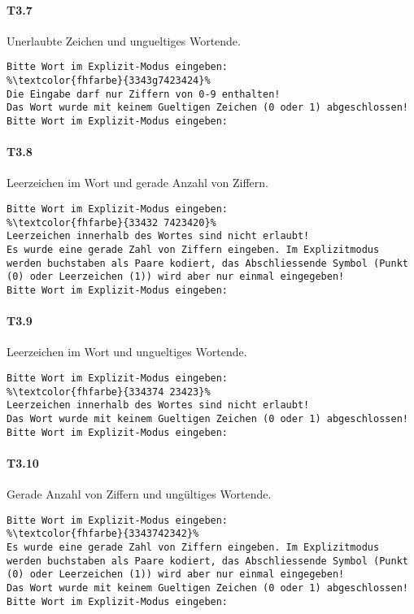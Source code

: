 \paragraph*{T3.7} Unerlaubte Zeichen und ungueltiges Wortende.
\begin{lstlisting}[escapechar=\%]
Bitte Wort im Explizit-Modus eingeben:
%\textcolor{fhfarbe}{3343g7423424}%
Die Eingabe darf nur Ziffern von 0-9 enthalten!
Das Wort wurde mit keinem Gueltigen Zeichen (0 oder 1) abgeschlossen!
Bitte Wort im Explizit-Modus eingeben:
\end{lstlisting}

\paragraph*{T3.8} Leerzeichen im Wort und gerade Anzahl von Ziffern.
\begin{lstlisting}[escapechar=\%]
Bitte Wort im Explizit-Modus eingeben:
%\textcolor{fhfarbe}{33432 7423420}%
Leerzeichen innerhalb des Wortes sind nicht erlaubt!
Es wurde eine gerade Zahl von Ziffern eingeben. Im Explizitmodus werden buchstaben als Paare kodiert, das Abschliessende Symbol (Punkt (0) oder Leerzeichen (1)) wird aber nur einmal eingegeben!
Bitte Wort im Explizit-Modus eingeben:
\end{lstlisting}

\paragraph*{T3.9} Leerzeichen im Wort und ungueltiges Wortende.
\begin{lstlisting}[escapechar=\%]
Bitte Wort im Explizit-Modus eingeben:
%\textcolor{fhfarbe}{334374 23423}%
Leerzeichen innerhalb des Wortes sind nicht erlaubt!
Das Wort wurde mit keinem Gueltigen Zeichen (0 oder 1) abgeschlossen!
Bitte Wort im Explizit-Modus eingeben:
\end{lstlisting}

\paragraph*{T3.10} Gerade Anzahl von Ziffern und ungültiges Wortende.
\begin{lstlisting}[escapechar=\%]
Bitte Wort im Explizit-Modus eingeben:
%\textcolor{fhfarbe}{3343742342}%
Es wurde eine gerade Zahl von Ziffern eingeben. Im Explizitmodus werden buchstaben als Paare kodiert, das Abschliessende Symbol (Punkt (0) oder Leerzeichen (1)) wird aber nur einmal eingegeben!
Das Wort wurde mit keinem Gueltigen Zeichen (0 oder 1) abgeschlossen!
Bitte Wort im Explizit-Modus eingeben:
\end{lstlisting}

